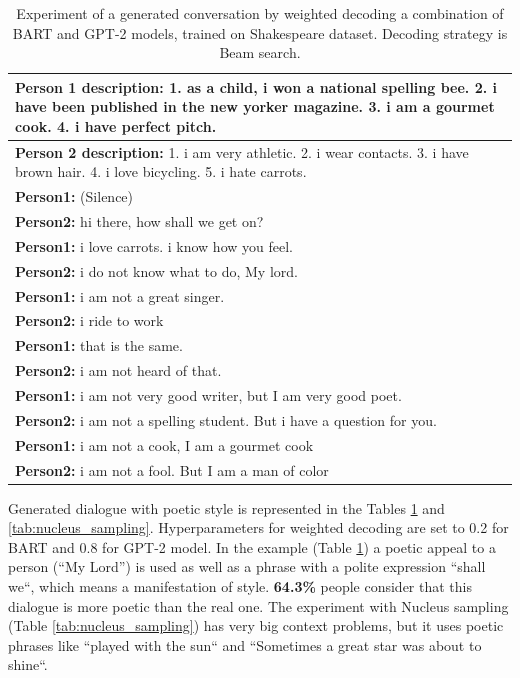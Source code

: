 \begin{table}[H]
\centering
 \begin{tabular}{|p{14cm}|} 
 \hline
 \textbf{Person 1 description:} 1. as a child, i won a national spelling bee. 2. i have been published in the new yorker magazine. 3. i am a gourmet cook. 4. i have perfect pitch. \\
 \hline
 \textbf{Person 2 description:} 1. i am very athletic. 2. i wear contacts. 3. i have brown hair. 4. i love bicycling. 5. i hate carrots. \\
 \hline
 \textbf{Person1:} (Silence) \\
 \textbf{Person2:} hi there, how shall we get on?  \\ 
 \textbf{Person1:} i love carrots. i know how you feel. \\
 \textbf{Person2:} i do not know what to do, My lord. \\
 \textbf{Person1:} i am not a great singer. \\
 \textbf{Person2:} i ride to work \\
 \textbf{Person1:} that is the same. \\
 \textbf{Person2:} i am not heard of that. \\
 \textbf{Person1:} i am not very good writer, but I am very good poet. \\
 \textbf{Person2:} i am not a spelling student. But i have a question for you. \\
 \textbf{Person1:} i am not a cook, I am a gourmet cook \\
 \textbf{Person2:} i am not a fool. But I am a man of color  \\
 \hline
 \end{tabular}
 \caption{Experiment of a generated conversation by weighted decoding a combination of BART and GPT-2 models, trained on Shakespeare dataset. Decoding strategy is Beam search.}
\label{tab:poetic_shakespear}
\end{table}

Generated dialogue with poetic style is represented in the Tables \ref{tab:poetic_shakespear} and \ref{tab:nucleus_sampling}. Hyperparameters for weighted decoding are set to 0.2 for BART and 0.8 for GPT-2 model. In the example (Table \ref{tab:poetic_shakespear}) a poetic appeal to a person (``My Lord'') is used as well as a phrase with a polite expression ``shall we``, which means a manifestation of style. \textbf{64.3\%} people consider that this dialogue is more poetic than the real one. The experiment with Nucleus sampling (Table \ref{tab:nucleus_sampling}) has very big context problems, but it uses poetic phrases like ``played with the sun`` and ``Sometimes a great star was about to shine``.

